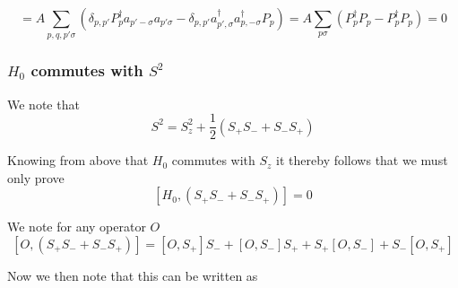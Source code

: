 \documentclass[11pt]{article} %
\begin{document}
\begin{equation}
= A\sum_{p,q,p'\sigma} \left(\delta_{p,p'}P_p^\dagger a_{p'-\sigma}a_{p'\sigma}-\delta_{p,p'}a_{p',\sigma}^\dagger a^\dagger_{p,-\sigma}P_p\right)=A\sum_{p\sigma} \left(P_p^\dagger P_p-P_p^\dagger P_p\right)=0\end{equation}


\subsubsection{$H_0$ commutes with $S^2$}

We note that \\
\begin{equation}
S^2=S_z^2+\frac{1}{2}\left(S_+S_- +S_-S_+ \right)
\end{equation}

Knowing from above that $H_0$ commutes with $S_z$ it thereby follows that  we must only prove\\

\begin{equation}
\left[H_0,\left(S_+S_- +S_-S_+ \right)\right]=0
\end{equation}

We note for any operator $O$ \\

\begin{equation}
\left[O,\left(S_+S_- +S_-S_+ \right)\right] =\left[O,S_+\right]S_-+\left[O,S_-\right]S_+ + S_+\left[O,S_-\right]+S_-\left[O,S_+\right]
\end{equation}


Now we then note that this can be written as \\
\end{document}
